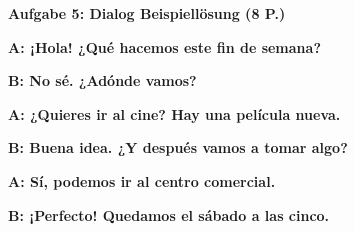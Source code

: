\documentclass[11pt,a4paper]{article}
\newcommand{\lsg}[1]{\textcolor{loesung}{\textbf{#1}}}
\begin{document}
\begin{gruppenbox}
\vspace{0.5em}

\textbf{Aufgabe 5: Dialog Beispiellösung (8 P.)}

\lsg{A: ¡Hola! ¿Qué hacemos este fin de semana?}

\lsg{B: No sé. ¿Adónde vamos?}

\lsg{A: ¿Quieres ir al cine? Hay una película nueva.}

\lsg{B: Buena idea. ¿Y después vamos a tomar algo?}

\lsg{A: Sí, podemos ir al centro comercial.}

\lsg{B: ¡Perfecto! Quedamos el sábado a las cinco.}

\end{gruppenbox}

\vspace{1em}
\end{document}

